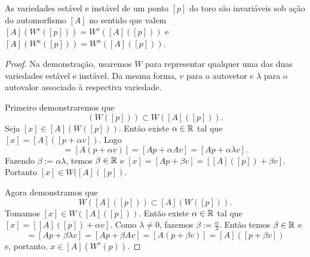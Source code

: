 \begin{proposition}
As variedades estável e instável de um ponto $[p]$ do toro são invariáveis sob ação do automorfismo $[A]$ no sentido que valem $[A](W^s([p])) = W^s([A]([p]))$ e $[A](W^u([p])) = W^u([A]([p]))$.
	\end{proposition}
\begin{proof}
	Na demonstração, usaremos $W$ para representar qualquer uma das duas variedades estável e instável. Da mesma forma, $v$ para o autovetor e $\lambda$ para o autovalor associado à respectiva variedade.

	Primeiro demonstraremos que
		\begin{equation*}
		[A](W([p])) \subset W([A]([p])).
		\end{equation*}
Seja $[x] \in [A](W([p]))$. Então existe $\alpha \in \mathbb{R}$ tal que $[x] = [A]([p + \alpha v])$. Logo
	\begin{equation*}
	[x] = [A(p + \alpha v)] = [Ap + \alpha Av] = [Ap + \alpha \lambda v].
	\end{equation*}
Fazendo $\beta := \alpha \lambda$, temos $\beta \in \mathbb{R}$ e $[x] = [Ap + \beta v] = [[A]([p]) + \beta v]$. Portanto $[x] \in W([A]([p])$.

	Agora demonstramos que
		\begin{equation*}
		W([A]([p])) \subset [A](W([p])).
		\end{equation*}
Tomamos $[x] \in W([A]([p]))$. Então existe $\alpha \in \mathbb{R}$ tal que $[x] = [[A]([p]) + \alpha v]$. Como $\lambda \neq 0$, fazemos $\beta := \frac{\alpha}{\lambda}$. Então temos $\beta \in \mathbb{R}$ e
	\begin{equation*}
	[x] = [Ap + \beta \lambda v] = [Ap + \beta Av] = [A(p + \beta v)] = [A]([p + \beta v])
		\end{equation*}
e, portanto, $x \in [A](W^s(p))$.
	\end{proof}


